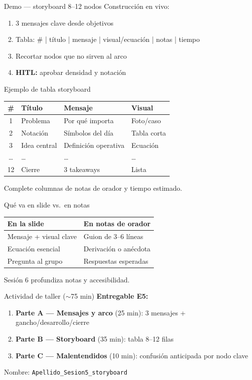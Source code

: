 \documentclass[aspectratio=169,11pt]{beamer}
\begin{document}
\begin{frame}{Demo --- storyboard 8--12 nodos}
Construcción en vivo:
\begin{enumerate}
\item 3 mensajes clave desde objetivos
\item Tabla: \# | título | mensaje | visual/ecuación | notas | tiempo
\item Recortar nodos que no sirven al arco
\item \textbf{HITL:} aprobar densidad y notación
\end{enumerate}
\end{frame}

\begin{frame}{Ejemplo de tabla storyboard}
\begin{tabularx}{\textwidth}{@{}clXX@{}}
\toprule
\# & Título & Mensaje & Visual \\
\midrule
1 & Problema & Por qué importa & Foto/caso \\
2 & Notación & Símbolos del día & Tabla corta \\
3 & Idea central & Definición operativa & Ecuación \\
\ldots & \ldots & \ldots & \ldots \\
12 & Cierre & 3 takeaways & Lista \\
\bottomrule
\end{tabularx}
\vspace{0.5em}
Complete columnas de notas de orador y tiempo estimado.
\end{frame}

\begin{frame}{Qué va en slide vs.\ en notas}
\begin{tabularx}{\textwidth}{@{}XX@{}}
\toprule
\textbf{En la slide} & \textbf{En notas de orador} \\
\midrule
Mensaje + visual clave & Guion de 3--6 líneas \\
Ecuación esencial & Derivación o anécdota \\
Pregunta al grupo & Respuestas esperadas \\
\bottomrule
\end{tabularx}
\vspace{0.8em}
Sesión 6 profundiza notas y accesibilidad.
\end{frame}

\begin{frame}{Actividad de taller ($\sim$75 min)}
\textbf{Entregable E5:}
\begin{enumerate}
\item \textbf{Parte A --- Mensajes y arco} (25 min): 3 mensajes + gancho/desarrollo/cierre
\item \textbf{Parte B --- Storyboard} (35 min): tabla 8--12 filas
\item \textbf{Parte C --- Malentendidos} (10 min): confusión anticipada por nodo clave
\end{enumerate}
Nombre: \texttt{Apellido\_Sesion5\_storyboard}
\end{frame}
\end{document}
